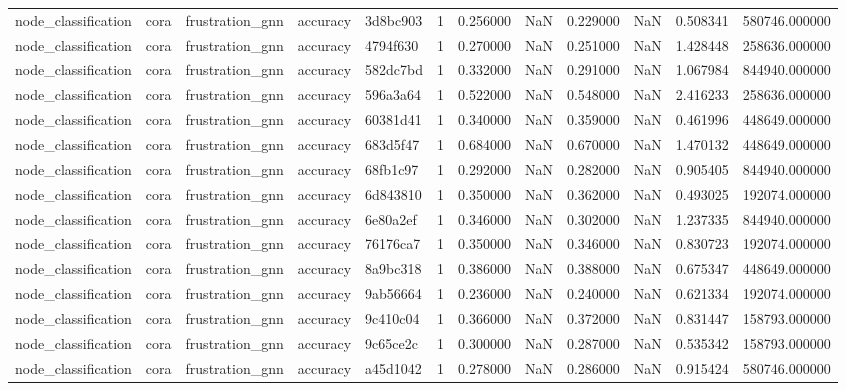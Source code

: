 \begin{tabular}{lllllrrrrrrr}
node_classification & cora & frustration_gnn & accuracy & 3d8bc903 & 1 & 0.256000 & NaN & 0.229000 & NaN & 0.508341 & 580746.000000 \\
node_classification & cora & frustration_gnn & accuracy & 4794f630 & 1 & 0.270000 & NaN & 0.251000 & NaN & 1.428448 & 258636.000000 \\
node_classification & cora & frustration_gnn & accuracy & 582dc7bd & 1 & 0.332000 & NaN & 0.291000 & NaN & 1.067984 & 844940.000000 \\
node_classification & cora & frustration_gnn & accuracy & 596a3a64 & 1 & 0.522000 & NaN & 0.548000 & NaN & 2.416233 & 258636.000000 \\
node_classification & cora & frustration_gnn & accuracy & 60381d41 & 1 & 0.340000 & NaN & 0.359000 & NaN & 0.461996 & 448649.000000 \\
node_classification & cora & frustration_gnn & accuracy & 683d5f47 & 1 & 0.684000 & NaN & 0.670000 & NaN & 1.470132 & 448649.000000 \\
node_classification & cora & frustration_gnn & accuracy & 68fb1c97 & 1 & 0.292000 & NaN & 0.282000 & NaN & 0.905405 & 844940.000000 \\
node_classification & cora & frustration_gnn & accuracy & 6d843810 & 1 & 0.350000 & NaN & 0.362000 & NaN & 0.493025 & 192074.000000 \\
node_classification & cora & frustration_gnn & accuracy & 6e80a2ef & 1 & 0.346000 & NaN & 0.302000 & NaN & 1.237335 & 844940.000000 \\
node_classification & cora & frustration_gnn & accuracy & 76176ca7 & 1 & 0.350000 & NaN & 0.346000 & NaN & 0.830723 & 192074.000000 \\
node_classification & cora & frustration_gnn & accuracy & 8a9bc318 & 1 & 0.386000 & NaN & 0.388000 & NaN & 0.675347 & 448649.000000 \\
node_classification & cora & frustration_gnn & accuracy & 9ab56664 & 1 & 0.236000 & NaN & 0.240000 & NaN & 0.621334 & 192074.000000 \\
node_classification & cora & frustration_gnn & accuracy & 9c410c04 & 1 & 0.366000 & NaN & 0.372000 & NaN & 0.831447 & 158793.000000 \\
node_classification & cora & frustration_gnn & accuracy & 9c65ce2c & 1 & 0.300000 & NaN & 0.287000 & NaN & 0.535342 & 158793.000000 \\
node_classification & cora & frustration_gnn & accuracy & a45d1042 & 1 & 0.278000 & NaN & 0.286000 & NaN & 0.915424 & 580746.000000 \\

\end{tabular}
